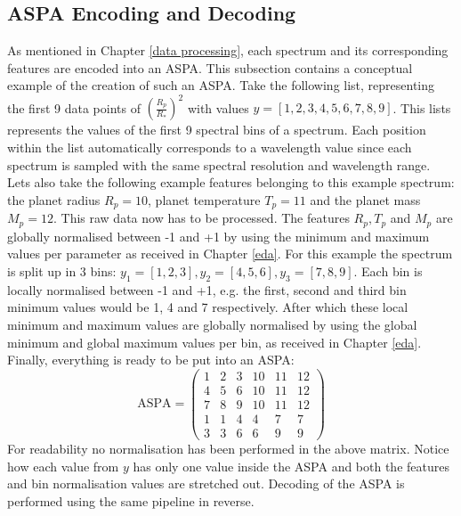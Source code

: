 \subsection{ASPA Encoding and Decoding} \label{ASPA encoding and decoding}
As mentioned in Chapter \ref{data processing}, each spectrum and its corresponding features are encoded into an ASPA. This subsection contains a conceptual example of the creation of such an ASPA. Take the following list, representing the first 9 data points of $(\frac{R_p}{R_*})^2$ with values $y=[1, 2, 3, 4, 5, 6, 7, 8, 9]$. This lists represents the values of the first 9 spectral bins of a spectrum. Each position within the list automatically corresponds to a wavelength value since each spectrum is sampled with the same spectral resolution and wavelength range. Lets also take the following example features belonging to this example spectrum: the planet radius $R_p = 10$, planet temperature $T_p = 11$ and the planet mass $M_p = 12$. This raw data now has to be processed. The features $R_p, T_p$ and $M_p$ are globally normalised between -1 and +1 by using the minimum and maximum values per parameter as received in Chapter \ref{eda}. For this example the spectrum is split up in 3 bins: $y_1=[1, 2, 3], y_2=[4, 5, 6], y_3=[7, 8, 9]$. Each bin is locally normalised between -1 and +1, e.g. the first, second and third bin minimum values would be 1, 4 and 7 respectively. After which these local minimum and maximum values are globally normalised by using the global minimum and global maximum values per bin, as received in Chapter \ref{eda}. Finally, everything is ready to be put into an ASPA:
$$ \mathrm{ASPA} = \left(\begin{matrix}1&2&3&10&11&12\\4&5&6&10&11&12\\7&8&9&10&11&12\\1&1&4&4&7&7\\3&3&6&6&9&9\end{matrix}\right) $$
For readability no normalisation has been performed in the above matrix. Notice how each value from $y$ has only one value inside the ASPA and both the features and bin normalisation values are stretched out. Decoding of the ASPA is performed using the same pipeline in reverse.




